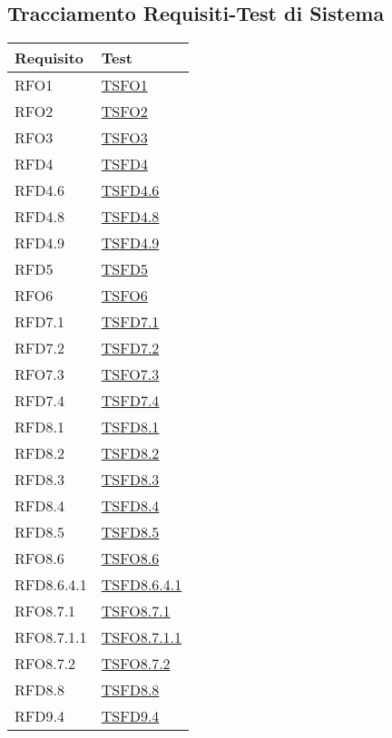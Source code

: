 \subsection{Tracciamento Requisiti-Test di Sistema}
\normalsize
\begin{longtable}[ht]{|>{\centering}m{5cm}|m{5cm}<{\centering}|}
\hline 
\textbf{Requisito} & \textbf{Test}\\
\hline
\endhead
RFO1 & \hyperlink{TVFO1}{TSFO1}\\ \hline
RFO2 & \hyperlink{TVFO2}{TSFO2}\\ \hline
RFO3 & \hyperlink{TVFO3}{TSFO3}\\ \hline
RFD4 & \hyperlink{TVFD4}{TSFD4}\\ \hline
RFD4.6 & \hyperlink{TVFD4.6}{TSFD4.6}\\ \hline
RFD4.8 & \hyperlink{TVFD4.8}{TSFD4.8}\\ \hline
RFD4.9 & \hyperlink{TVFD4.9}{TSFD4.9}\\ \hline
RFD5 & \hyperlink{TVFD5}{TSFD5}\\ \hline
RFO6 & \hyperlink{TVFO6}{TSFO6}\\ \hline
RFD7.1 & \hyperlink{TVFD7.1}{TSFD7.1}\\ \hline
RFD7.2 & \hyperlink{TVFD7.2}{TSFD7.2}\\ \hline
RFO7.3 & \hyperlink{TVFO7.3}{TSFO7.3}\\ \hline
RFD7.4 & \hyperlink{TVFD7.4}{TSFD7.4}\\ \hline
RFD8.1 & \hyperlink{TVFD8.1}{TSFD8.1}\\ \hline
RFD8.2 & \hyperlink{TVFD8.2}{TSFD8.2}\\ \hline
RFD8.3 & \hyperlink{TVFD8.3}{TSFD8.3}\\ \hline
RFD8.4 & \hyperlink{TVFD8.4}{TSFD8.4}\\ \hline
RFD8.5 & \hyperlink{TVFD8.5}{TSFD8.5}\\ \hline
RFO8.6 & \hyperlink{TVFO8.6}{TSFO8.6}\\ \hline
RFD8.6.4.1 & \hyperlink{TVFD8.6.4.1}{TSFD8.6.4.1}\\ \hline
RFO8.7.1 & \hyperlink{TVFO8.7.1}{TSFO8.7.1}\\ \hline
RFO8.7.1.1 & \hyperlink{TVFO8.7.1.1}{TSFO8.7.1.1}\\ \hline
RFO8.7.2 & \hyperlink{TVFO8.7.2}{TSFO8.7.2}\\ \hline
RFD8.8 & \hyperlink{TVFD8.8}{TSFD8.8}\\ \hline
RFD9.4 & \hyperlink{TVFD9.4}{TSFD9.4}\\ \hline

\end{longtable}
